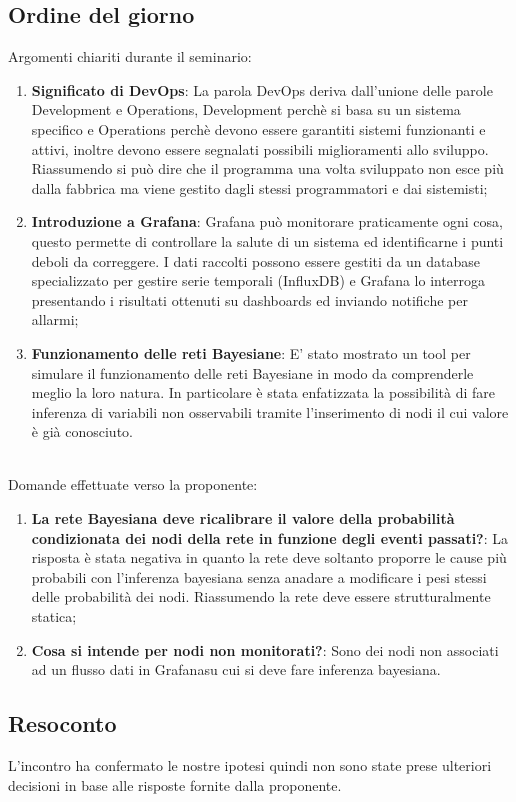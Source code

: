 \documentclass{article}
\begin{document}
    \subsection{Ordine del giorno}
    Argomenti chiariti durante il seminario:
    \begin{enumerate}
        \item \textbf{Significato di DevOps}: La parola DevOps deriva dall'unione delle parole Development e Operations, Development perchè si basa su un sistema specifico e Operations perchè devono essere garantiti sistemi funzionanti e attivi, inoltre devono essere segnalati possibili miglioramenti allo sviluppo. Riassumendo si può dire che il programma una volta sviluppato non esce più dalla fabbrica ma viene gestito dagli stessi programmatori e dai sistemisti;
        \item \textbf{Introduzione a Grafana}: Grafana può monitorare praticamente ogni cosa, questo permette di controllare la salute di un sistema ed identificarne i punti deboli da correggere. I dati raccolti possono essere gestiti da un database specializzato per gestire serie temporali (InfluxDB) e Grafana lo interroga presentando i risultati ottenuti su dashboards ed inviando notifiche per allarmi;
        \item \textbf{Funzionamento delle reti Bayesiane}: E' stato mostrato un tool per simulare il funzionamento delle reti Bayesiane in modo da comprenderle meglio la loro natura. In particolare è stata enfatizzata la possibilità di fare inferenza di variabili non osservabili tramite l'inserimento di nodi il cui valore è già conosciuto.
    \end{enumerate}
    \\
    Domande effettuate verso la proponente:
    \begin{enumerate}
        \item \textbf{La rete Bayesiana deve ricalibrare il valore della probabilità condizionata dei nodi della rete in funzione degli eventi passati?}: La risposta è stata negativa in quanto la rete deve soltanto proporre le cause più probabili con l'inferenza bayesiana senza anadare a modificare i pesi stessi delle probabilità dei nodi. Riassumendo la rete deve essere strutturalmente statica;
        \item \textbf{Cosa si intende per nodi non monitorati?}: Sono dei nodi non associati ad un flusso dati in Grafana\pedice su cui si deve fare inferenza bayesiana.
    \end{enumerate}
    \subsection{Resoconto}
    L'incontro ha confermato le nostre ipotesi quindi non sono state prese ulteriori decisioni in base alle risposte fornite dalla proponente.
    
\end{document}
